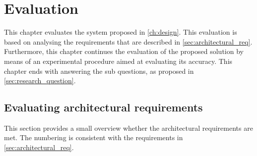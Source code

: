 \chapter{Evaluation}\label{ch:evaluation}
This chapter evaluates the system proposed in \autoref{ch:design}. This evaluation is based on analysing the requirements that are described in \autoref{sec:architectural_req}. Furthermore, this chapter continues the evaluation of the proposed solution by means of an experimental procedure aimed at evaluating its accuracy. This chapter ends with answering the sub questions, as proposed in \autoref{sec:research_question}.

\section{Evaluating architectural requirements} \label{sec:eval_arch_req}
This section provides a small overview whether the architectural requirements are met. The numbering is consistent with the requirements in \autoref{sec:architectural_req}.

